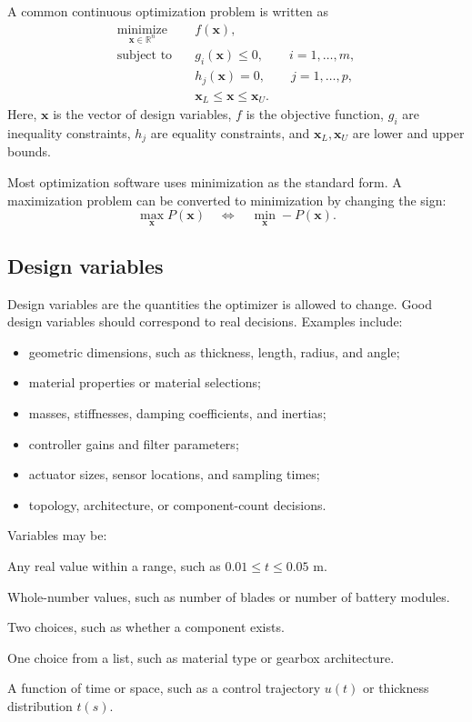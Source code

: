 \documentclass[11pt]{article}
\newcommand{\vect}[1]{\boldsymbol{#1}}
\newcommand{\des}{\vect{x}}
\newcommand{\R}{\mathbb{R}}
\begin{document}
A common continuous optimization problem is written as
\begin{align}
\underset{\des \in \R^n}{\text{minimize}} \quad & f(\des), \\
\text{subject to} \quad & g_i(\des) \leq 0, \qquad i=1,\ldots,m, \\
& h_j(\des) = 0, \qquad j=1,\ldots,p, \\
& \des_L \leq \des \leq \des_U.
\label{eq:standard-problem}
\end{align}
Here, $\des$ is the vector of design variables, $f$ is the objective function, $g_i$ are inequality constraints, $h_j$ are equality constraints, and $\des_L,\des_U$ are lower and upper bounds.

Most optimization software uses minimization as the standard form. A maximization problem can be converted to minimization by changing the sign:
\begin{equation}
\max_{\des} P(\des)
\quad \Longleftrightarrow \quad
\min_{\des} -P(\des).
\end{equation}

\subsection{Design variables}

Design variables are the quantities the optimizer is allowed to change. Good design variables should correspond to real decisions. Examples include:
\begin{itemize}[leftmargin=1.4em]
  \item geometric dimensions, such as thickness, length, radius, and angle;
  \item material properties or material selections;
  \item masses, stiffnesses, damping coefficients, and inertias;
  \item controller gains and filter parameters;
  \item actuator sizes, sensor locations, and sampling times;
  \item topology, architecture, or component-count decisions.
\end{itemize}

Variables may be:
\begin{description}[leftmargin=1.6em,style=nextline]
  \item[Continuous] Any real value within a range, such as $0.01 \leq t \leq 0.05$ m.
  \item[Integer] Whole-number values, such as number of blades or number of battery modules.
  \item[Binary] Two choices, such as whether a component exists.
  \item[Categorical or discrete] One choice from a list, such as material type or gearbox architecture.
  \item[Functional] A function of time or space, such as a control trajectory $u(t)$ or thickness distribution $t(s)$.
\end{description}
\end{document}
